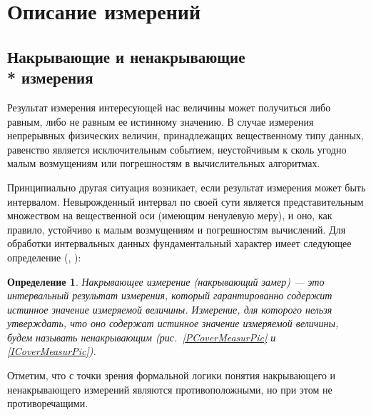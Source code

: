 \documentclass[a5paper,openany]{book}
\newtheorem{definition}{Определение}[section]
\begin{document}
{{	\section{Описание измерений}
	
\subsection{Накрывающие и ненакрывающие \\* измерения} 
\label{CoverMeasrSect} 

Результат измерения интересующей нас величины может получиться либо равным, либо не равным ее истинному значению.
В случае измерения непрерывных физических величин, принадлежащих вещественному типу данных, равенство 
является исключительным событием,  неустойчивым к сколь угодно малым возмущениям или погрешностям в вычислительных алгоритмах. 

Принципиально другая ситуация возникает, если результат измерения может быть интервалом. 
Невырожденный интервал по своей сути является  представительным множеством на  
вещественной оси (имеющим ненулевую меру), и оно, как правило, устойчиво к малым возмущениям и 
погрешностям вычислений. Для обработки интервальных данных 
фундаментальный характер имеет следующее определение (\cite{MetodikaBook}, \cite{Enclosing2022}):
\begin{definition}
	\textsl{Накрывающее измерение} (накрывающий замер) --- это интервальный результат 
	измерения, который гарантированно содержит истинное значение измеряемой величины. 
	Измерение, для которого нельзя утверждать, что оно содержат истинное значение 
	измеряемой величины, будем называть \textsl{ненакрывающим} (рис.~\ref{PCoverMeasurPic} 
	и \ref{ICoverMeasurPic}).  
\end{definition}

Отметим, что с точки зрения формальной логики понятия накрывающего и ненакрывающего 
измерений являются противоположными, но при этом не противоречащими. 




}}
\end{document}
